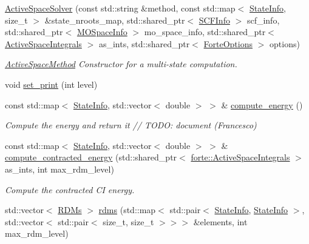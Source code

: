 \begin{DoxyCompactItemize}
\item 
\mbox{\hyperlink{classforte_1_1_active_space_solver_af2b538aa99fd5b6493d0825f9c0a3729}{Active\+Space\+Solver}} (const std\+::string \&method, const std\+::map$<$ \mbox{\hyperlink{classforte_1_1_state_info}{State\+Info}}, size\+\_\+t $>$ \&state\+\_\+nroots\+\_\+map, std\+::shared\+\_\+ptr$<$ \mbox{\hyperlink{classforte_1_1_s_c_f_info}{S\+C\+F\+Info}} $>$ scf\+\_\+info, std\+::shared\+\_\+ptr$<$ \mbox{\hyperlink{classforte_1_1_m_o_space_info}{M\+O\+Space\+Info}} $>$ mo\+\_\+space\+\_\+info, std\+::shared\+\_\+ptr$<$ \mbox{\hyperlink{classforte_1_1_active_space_integrals}{Active\+Space\+Integrals}} $>$ as\+\_\+ints, std\+::shared\+\_\+ptr$<$ \mbox{\hyperlink{classforte_1_1_forte_options}{Forte\+Options}} $>$ options)
\begin{DoxyCompactList}\small\item\em \mbox{\hyperlink{classforte_1_1_active_space_method}{Active\+Space\+Method}} Constructor for a multi-\/state computation. \end{DoxyCompactList}\item 
void \mbox{\hyperlink{classforte_1_1_active_space_solver_a40e5dded4471f30b5aa7afbe27167031}{set\+\_\+print}} (int level)
\item 
const std\+::map$<$ \mbox{\hyperlink{classforte_1_1_state_info}{State\+Info}}, std\+::vector$<$ double $>$ $>$ \& \mbox{\hyperlink{classforte_1_1_active_space_solver_a719be2ea9e2d227fd810481f7dd644a1}{compute\+\_\+energy}} ()
\begin{DoxyCompactList}\small\item\em Compute the energy and return it // T\+O\+DO\+: document (Francesco) \end{DoxyCompactList}\item 
const std\+::map$<$ \mbox{\hyperlink{classforte_1_1_state_info}{State\+Info}}, std\+::vector$<$ double $>$ $>$ \& \mbox{\hyperlink{classforte_1_1_active_space_solver_a53ed58e64499f8fa661b49d48648f3cb}{compute\+\_\+contracted\+\_\+energy}} (std\+::shared\+\_\+ptr$<$ \mbox{\hyperlink{classforte_1_1_active_space_integrals}{forte\+::\+Active\+Space\+Integrals}} $>$ as\+\_\+ints, int max\+\_\+rdm\+\_\+level)
\begin{DoxyCompactList}\small\item\em Compute the contracted CI energy. \end{DoxyCompactList}\item 
std\+::vector$<$ \mbox{\hyperlink{classforte_1_1_r_d_ms}{R\+D\+Ms}} $>$ \mbox{\hyperlink{classforte_1_1_active_space_solver_a96b316d00aada0b7b68c153f8c89bcea}{rdms}} (std\+::map$<$ std\+::pair$<$ \mbox{\hyperlink{classforte_1_1_state_info}{State\+Info}}, \mbox{\hyperlink{classforte_1_1_state_info}{State\+Info}} $>$, std\+::vector$<$ std\+::pair$<$ size\+\_\+t, size\+\_\+t $>$$>$$>$ \&elements, int max\+\_\+rdm\+\_\+level)

\end{DoxyCompactItemize}

